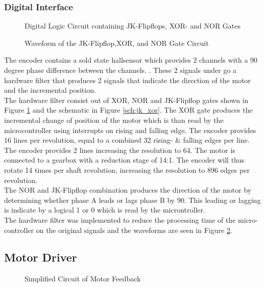 \subsubsection{Digital Interface} 

\begin{figure}[h]
	\centering
	
	\caption{Digital Logic Circuit containing JK-Flipflops, XOR- and NOR Gates}
	\label{fig:jk_xor}
\end{figure}

\begin{figure}[h]
	\centering
	
	\caption{Waveform of the JK-Flipflop,XOR, and NOR Gate Circuit}
	\label{fig:jk_xor_waveform}
\end{figure}

The encoder contains a sold state hallsensor which provides 2 channels with a 90 degree phase difference between the channels. \citep{faulhaberencoder}. These 2 signals under go a hardware filter that produces 2 signals that indicate the direction of the motor and the incremental position.\\

The hardware filter consist out of XOR, NOR and JK-Flipflop gates shown in Figure \ref{fig:jk_xor} and the schematic in Figure \ref{sch:jk_xor}. The XOR gate produces the incremental change of position of the motor which is than read by the microcontroller using interrupts on rising and falling edge. The encoder provides 16 lines per revolution, equal to a combined 32 rising- \& falling edges per line. The encoder provides 2 lines increasing the resolution to 64. The motor is connected to a gearbox with a reduction stage of 14:1. The encoder will thus rotate 14 times per shaft revolution, increasing the resolution to 896 edges per revolution.\\

 The NOR and JK-Flipflop combination produces the direction of the motor by determining whether phase A leads or lags phase B by 90\textdegree. This leading or lagging is indicate by a logical 1 or 0 which is read by the microntroller.\\
 
 The hardware filter was implemented to reduce the processing time of the micro-controller on the original signals and the waveforms are seen in Figure \ref{fig:jk_xor_waveform}.



\subsection{Motor Driver}
\begin{figure}[h]
	\centering
	
	\caption{Simplified Circuit of Motor Feedback}
	\label{fig:feedback_current}
\end{figure}

